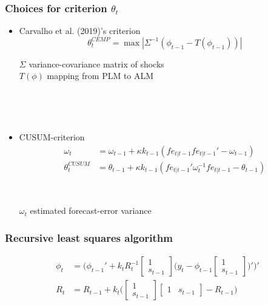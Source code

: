 \documentclass[11pt]{beamer}
\begin{document}
\begin{frame}
	\frametitle{Choices for criterion $\theta_t$}
	\label{g}
\begin{itemize}
\item Carvalho et al. (2019)'s criterion  
\begin{equation}
\theta_t^{CEMP} = \max | \Sigma^{-1} ( \phi_{t-1} - T(\phi_{t-1})) |
\end{equation}


$\Sigma$ variance-covariance matrix of shocks \\
$T(\phi)$ mapping from PLM to ALM

\

\

\item CUSUM-criterion
\begin{align}
\omega_t & =  \omega_{t-1} + \kappa k_{t-1}(fe_{t|t-1} fe_{t|t-1}'  -\omega_{t-1})\\
\theta_t^{CUSUM} & =  \theta_{t-1} + \kappa k_{t-1}(fe_{t|t-1}'\omega_t^{-1}fe_{t|t-1} -\theta_{t-1})
\end{align}

\

$\omega_t$ estimated forecast-error variance
\end{itemize}




\vfill

\hyperlink{anchoring1}{}	


\end{frame}

\begin{frame}
	\frametitle{Recursive least squares algorithm}
	\label{RLS}


\begin{align}
\phi_t  & = \bigg( \phi_{t-1}' + k_t R_t^{-1}\begin{bmatrix} 1 \\ s_{t-1} \end{bmatrix}\bigg(y_{t} - \phi_{t-1} \begin{bmatrix} 1 \\ s_{t-1} \end{bmatrix} \bigg)' \bigg)' \\
R_t &= R_{t-1} +  k_t \bigg( \begin{bmatrix} 1 \\ s_{t-1} \end{bmatrix} \begin{bmatrix} 1 & s_{t-1} \end{bmatrix}  - R_{t-1} \bigg)
\end{align}


\vfill

\hyperlink{anchoring1}{}	


\end{frame}
\end{document}
